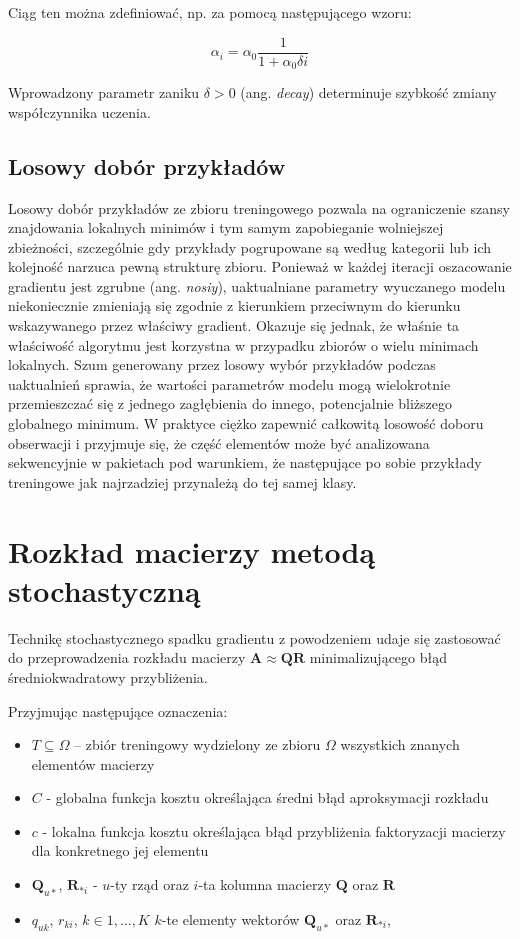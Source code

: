 \documentclass{pracamgr}
\begin{document}
Ciąg ten można zdefiniować, np. za pomocą następującego wzoru:

\[
\alpha_i = \alpha_0 \frac{1}{1 + \alpha_0 \delta i}
\]

Wprowadzony parametr zaniku $\delta > 0$ (ang. \textit{decay}) determinuje szybkość zmiany współczynnika uczenia. 

\subsection{Losowy dobór przykładów}

Losowy dobór przykładów ze zbioru treningowego pozwala na ograniczenie szansy znajdowania lokalnych minimów i tym samym zapobieganie wolniejszej zbieżności, szczególnie gdy przykłady pogrupowane są według kategorii lub ich kolejność narzuca pewną strukturę zbioru. Ponieważ w każdej iteracji oszacowanie gradientu jest zgrubne (ang. \textit{nosiy}), uaktualniane parametry wyuczanego modelu niekoniecznie zmieniają się zgodnie z kierunkiem przeciwnym do kierunku wskazywanego przez właściwy gradient. Okazuje się jednak, że właśnie ta właściwość algorytmu jest korzystna w przypadku zbiorów o wielu minimach lokalnych. Szum generowany przez losowy wybór przykładów podczas uaktualnień sprawia, że wartości parametrów modelu mogą wielokrotnie przemieszczać się z jednego zagłębienia do innego, potencjalnie bliższego globalnego minimum. W praktyce ciężko zapewnić całkowitą losowość doboru obserwacji i przyjmuje się, że część elementów może być analizowana sekwencyjnie w pakietach pod warunkiem, że następujące po sobie przykłady treningowe jak najrzadziej przynależą do tej samej klasy.

\section{Rozkład macierzy metodą stochastyczną}
Technikę stochastycznego spadku gradientu z powodzeniem udaje się zastosować do przeprowadzenia rozkładu macierzy $\mathbf{A} \approx \mathbf{Q} \mathbf{R}$ minimalizującego błąd średniokwadratowy przybliżenia.

Przyjmując następujące oznaczenia:
\begin{itemize} %
    \item $T \subseteq \Omega$ – zbiór treningowy wydzielony ze zbioru $\Omega$ wszystkich znanych elementów macierzy 
    \item $C$ - globalna funkcja kosztu określająca średni błąd aproksymacji rozkładu
    \item $c$ - lokalna funkcja kosztu określająca błąd przybliżenia faktoryzacji macierzy dla konkretnego jej elementu
    \item $\mathbf{Q}_{u \ast}$, $\mathbf{R}_{\ast i}$ - $u$-ty rząd oraz $i$-ta kolumna macierzy $\mathbf{Q}$ oraz $\mathbf{R}$
    \item $q_{uk}$, $r_{ki}$, $k \in {1, \ldots, K}$ $k$-te elementy wektorów $\mathbf{Q}_{u \ast}$ oraz $\mathbf{R}_{\ast i}$,  
\end{itemize}
\end{document}
